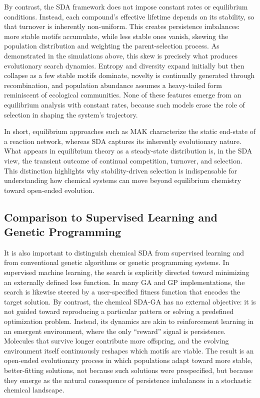 \documentclass[life,article,submit,pdftex,moreauthors]{Definitions/mdpi}
\begin{document}
By contrast, the SDA framework does not impose constant rates or equilibrium conditions. Instead, each compound’s effective lifetime depends on its stability, so that turnover is inherently non-uniform. This creates persistence imbalances: more stable motifs accumulate, while less stable ones vanish, skewing the population distribution and weighting the parent-selection process. As demonstrated in the simulations above, this skew is precisely what produces evolutionary search dynamics. Entropy and diversity expand initially but then collapse as a few stable motifs dominate, novelty is continually generated through recombination, and population abundance assumes a heavy-tailed form reminiscent of ecological communities. None of these features emerge from an equilibrium analysis with constant rates, because such models erase the role of selection in shaping the system’s trajectory.

In short, equilibrium approaches such as MAK characterize the static end-state of a reaction network, whereas SDA captures its inherently evolutionary nature. What appears in equilibrium theory as a steady-state distribution is, in the SDA view, the transient outcome of continual competition, turnover, and selection. This distinction highlights why stability-driven selection is indispensable for understanding how chemical systems can move beyond equilibrium chemistry toward open-ended evolution.


\subsection{Comparison to Supervised Learning and Genetic Programming}  

It is also important to distinguish chemical SDA from supervised learning and from conventional genetic algorithms or genetic programming systems. In supervised machine learning, the search is explicitly directed toward minimizing an externally defined loss function. In many GA and GP implementations, the search is likewise steered by a user-specified fitness function that encodes the target solution. By contrast, the chemical SDA-GA has no external objective: it is not guided toward reproducing a particular pattern or solving a predefined optimization problem. Instead, its dynamics are akin to reinforcement learning in an emergent environment, where the only “reward” signal is persistence. Molecules that survive longer contribute more offspring, and the evolving environment itself continuously reshapes which motifs are viable. The result is an open-ended evolutionary process in which populations adapt toward more stable, better-fitting solutions, not because such solutions were prespecified, but because they emerge as the natural consequence of persistence imbalances in a stochastic chemical landscape.
\end{document}
